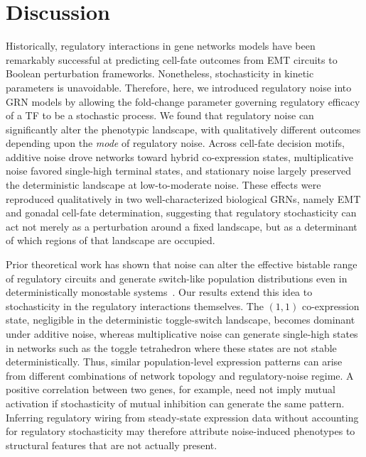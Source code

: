 \documentclass[11pt]{article}
\begin{document}
\section{Discussion}

Historically, regulatory interactions in gene networks models have been remarkably successful at predicting cell-fate outcomes from EMT circuits to Boolean perturbation frameworks. Nonetheless, stochasticity in kinetic parameters is unavoidable. Therefore, here, we introduced regulatory noise into GRN models by allowing the fold-change parameter governing regulatory efficacy of a TF to be a stochastic process. We found that regulatory noise can significantly alter the phenotypic landscape, with qualitatively different outcomes depending upon the \emph{mode} of regulatory noise. Across cell-fate decision motifs, additive noise drove networks toward hybrid co-expression states, multiplicative noise favored single-high terminal states, and stationary noise largely preserved the deterministic landscape at low-to-moderate noise. These effects were reproduced qualitatively in two well-characterized biological GRNs, namely EMT and gonadal cell-fate determination, suggesting that regulatory stochasticity can act not merely as a perturbation around a fixed landscape, but as a determinant of which regions of that landscape are occupied.

Prior theoretical work has shown that noise can alter the effective bistable range of regulatory circuits and generate switch-like population distributions even in deterministically monostable systems~\cite{OchabMarcinek2010w}. Our results extend this idea to stochasticity in the regulatory interactions themselves. The $(1, 1)$ co-expression state, negligible in the deterministic toggle-switch landscape, becomes dominant under additive noise, whereas multiplicative noise can generate single-high states in networks such as the toggle tetrahedron where these states are not stable deterministically. Thus, similar population-level expression patterns can arise from different combinations of network topology and regulatory-noise regime. A positive correlation between two genes, for example, need not imply mutual activation if stochasticity of mutual inhibition can generate the same pattern. Inferring regulatory wiring from steady-state expression data without accounting for regulatory stochasticity may therefore attribute noise-induced phenotypes to structural features that are not actually present.
\end{document}
